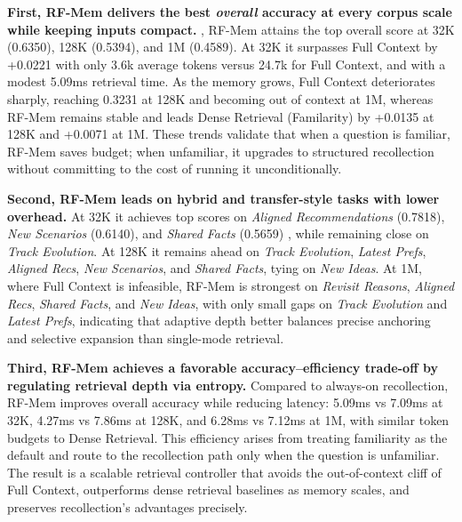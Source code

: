 \textbf{First, RF-Mem delivers the best \emph{overall} accuracy at every corpus scale while keeping inputs compact.} , RF-Mem attains the top overall score at 32K (0.6350), 128K (0.5394), and 1M (0.4589). At 32K it surpasses Full Context by +0.0221 with only 3.6k average tokens versus 24.7k for Full Context, and with a modest 5.09ms retrieval time. As the memory grows, Full Context deteriorates sharply, reaching 0.3231 at 128K and becoming out of context at 1M, whereas RF-Mem remains stable and leads Dense Retrieval (Familarity) by +0.0135 at 128K and +0.0071 at 1M. These trends validate that when a question is familiar, RF-Mem saves budget; when unfamiliar, it upgrades to structured recollection without committing to the cost of running it unconditionally.

\textbf{Second, RF-Mem leads on hybrid and transfer-style tasks with lower overhead.} At 32K it achieves top scores on \emph{Aligned Recommendations} (0.7818), \emph{New Scenarios} (0.6140), and \emph{Shared Facts} (0.5659) , while remaining close on \emph{Track Evolution}. 
At 128K it remains ahead on \emph{Track Evolution}, \emph{Latest Prefs}, \emph{Aligned Recs}, \emph{New Scenarios}, and \emph{Shared Facts}, tying on \emph{New Ideas}. 
At 1M, where Full Context is infeasible, RF-Mem is strongest on \emph{Revisit Reasons}, \emph{Aligned Recs}, \emph{Shared Facts}, and \emph{New Ideas}, with only small gaps on \emph{Track Evolution} and \emph{Latest Prefs}, indicating that adaptive depth better balances precise anchoring and selective expansion than single-mode retrieval.

\textbf{Third, RF-Mem achieves a favorable accuracy–efficiency trade-off by regulating retrieval depth via entropy.} Compared to always-on recollection, RF-Mem improves overall accuracy while reducing latency: 5.09ms vs 7.09ms at 32K, 4.27ms vs 7.86ms at 128K, and 6.28ms vs 7.12ms at 1M, with similar token budgets to Dense Retrieval. This efficiency arises from treating familiarity as the default and route to the recollection path only when the question is unfamiliar. The result is a scalable retrieval controller that avoids the out-of-context cliff of Full Context, outperforms dense retrieval baselines as memory scales, and preserves recollection’s advantages precisely.

